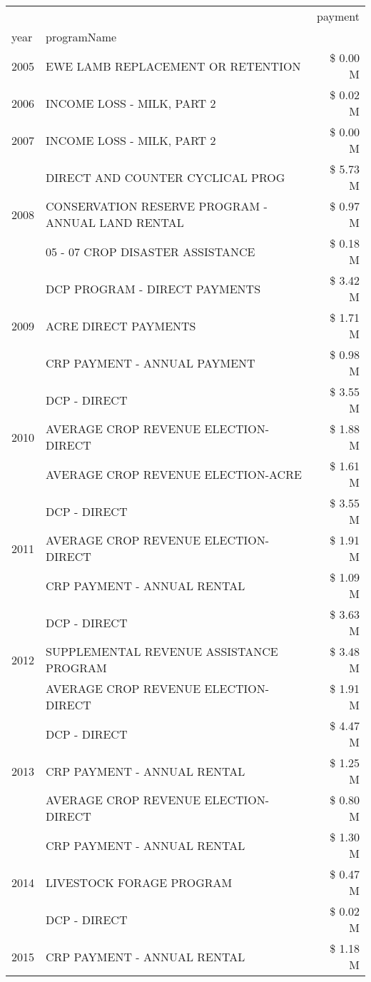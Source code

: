\begin{tabular}{llr}
\toprule
 &  & payment \\
year & programName &  \\
\midrule
2005 & EWE LAMB REPLACEMENT OR RETENTION & \$ 0.00 M \\
\cline{1-3}
2006 & INCOME LOSS - MILK, PART 2 & \$ 0.02 M \\
\cline{1-3}
2007 & INCOME LOSS - MILK, PART 2 & \$ 0.00 M \\
\cline{1-3}
\multirow[t]{3}{*}{2008} & DIRECT AND COUNTER CYCLICAL PROG & \$ 5.73 M \\
 & CONSERVATION RESERVE PROGRAM - ANNUAL LAND RENTAL & \$ 0.97 M \\
 & 05 - 07 CROP DISASTER ASSISTANCE & \$ 0.18 M \\
\cline{1-3}
\multirow[t]{3}{*}{2009} & DCP PROGRAM - DIRECT PAYMENTS & \$ 3.42 M \\
 & ACRE DIRECT PAYMENTS & \$ 1.71 M \\
 & CRP PAYMENT - ANNUAL PAYMENT & \$ 0.98 M \\
\cline{1-3}
\multirow[t]{3}{*}{2010} & DCP - DIRECT & \$ 3.55 M \\
 & AVERAGE CROP REVENUE ELECTION-DIRECT & \$ 1.88 M \\
 & AVERAGE CROP REVENUE ELECTION-ACRE & \$ 1.61 M \\
\cline{1-3}
\multirow[t]{3}{*}{2011} & DCP - DIRECT & \$ 3.55 M \\
 & AVERAGE CROP REVENUE ELECTION-DIRECT & \$ 1.91 M \\
 & CRP PAYMENT - ANNUAL RENTAL & \$ 1.09 M \\
\cline{1-3}
\multirow[t]{3}{*}{2012} & DCP - DIRECT & \$ 3.63 M \\
 & SUPPLEMENTAL REVENUE ASSISTANCE PROGRAM & \$ 3.48 M \\
 & AVERAGE CROP REVENUE ELECTION-DIRECT & \$ 1.91 M \\
\cline{1-3}
\multirow[t]{3}{*}{2013} & DCP - DIRECT & \$ 4.47 M \\
 & CRP PAYMENT - ANNUAL RENTAL & \$ 1.25 M \\
 & AVERAGE CROP REVENUE ELECTION-DIRECT & \$ 0.80 M \\
\cline{1-3}
\multirow[t]{3}{*}{2014} & CRP PAYMENT - ANNUAL RENTAL & \$ 1.30 M \\
 & LIVESTOCK FORAGE PROGRAM & \$ 0.47 M \\
 & DCP - DIRECT & \$ 0.02 M \\
\cline{1-3}
\multirow[t]{3}{*}{2015} & CRP PAYMENT - ANNUAL RENTAL & \$ 1.18 M \\

\end{tabular}
